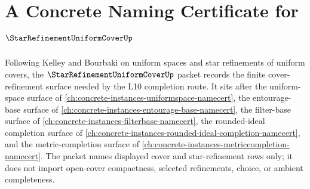 \chapter{A Concrete Naming Certificate for $\StarRefinementUniformCoverUp$}
\label{ch:concrete-instances-star-refinement-uniform-cover-namecert}

Following Kelley and Bourbaki on uniform spaces and star refinements of uniform covers, the $\StarRefinementUniformCoverUp$ packet records the finite cover-refinement surface needed by the L10 completion route. It sits after the uniform-space surface of \autoref{ch:concrete-instances-uniformspace-namecert}, the entourage-base surface of \autoref{ch:concrete-instances-entourage-base-namecert}, the filter-base surface of \autoref{ch:concrete-instances-filterbase-namecert}, the rounded-ideal completion surface of \autoref{ch:concrete-instances-rounded-ideal-completion-namecert}, and the metric-completion surface of \autoref{ch:concrete-instances-metriccompletion-namecert}. The packet names displayed cover and star-refinement rows only; it does not import open-cover compactness, selected refinements, choice, or ambient completeness.

